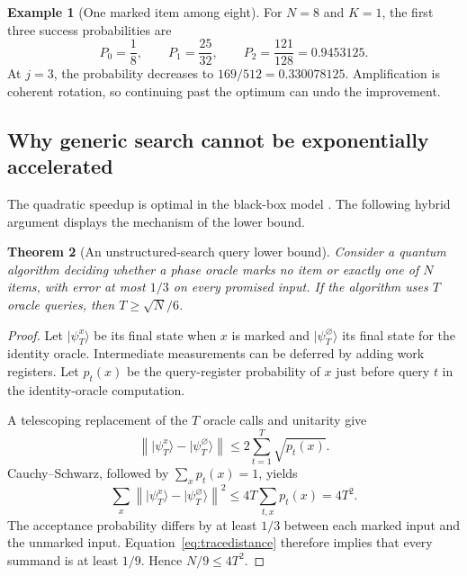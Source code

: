 \documentclass[11pt,a4paper]{article}
\newcommand{\ket}[1]{\lvert #1\rangle}
\newcommand{\norm}[1]{\left\lVert #1\right\rVert}
\newtheorem{theorem}{Theorem}[section]
\theoremstyle{definition}
\newtheorem{example}[theorem]{Example}
\theoremstyle{remark}
\numberwithin{equation}{section}
\begin{document}
\begin{example}[One marked item among eight]
For $N=8$ and $K=1$, the first three success probabilities are
\begin{equation}
 P_0=\frac18,\qquad P_1=\frac{25}{32},\qquad
 P_2=\frac{121}{128}=0.9453125.
\end{equation}
At $j=3$, the probability decreases to $169/512=0.330078125$.
Amplification is coherent rotation, so continuing past the optimum can
undo the improvement.
\end{example}

\subsection{Why generic search cannot be exponentially accelerated}
The quadratic speedup is optimal in the black-box model
\citep{grover1996,bennett1997}. The following hybrid argument displays the
mechanism of the lower bound.

\begin{theorem}[An unstructured-search query lower bound]
Consider a quantum algorithm deciding whether a phase oracle marks no
item or exactly one of $N$ items, with error at most $1/3$ on every
promised input. If the algorithm uses $T$ oracle queries, then
$T\geq\sqrt N/6$.
\end{theorem}
\begin{proof}
Let $\ket{\psi_T^x}$ be its final state when $x$ is marked and
$\ket{\psi_T^\varnothing}$ its final state for the identity oracle.
Intermediate measurements can be deferred by adding work registers.
Let $p_t(x)$ be the query-register probability of $x$ just before query $t$
in the identity-oracle computation.

A telescoping replacement of the $T$ oracle calls and unitarity give
\begin{equation}
 \norm{\ket{\psi_T^x}-\ket{\psi_T^\varnothing}}
 \leq 2\sum_{t=1}^T\sqrt{p_t(x)}.
\end{equation}
Cauchy--Schwarz, followed by $\sum_xp_t(x)=1$, yields
\begin{equation}
 \sum_x\norm{\ket{\psi_T^x}-\ket{\psi_T^\varnothing}}^2
 \leq4T\sum_{t,x}p_t(x)=4T^2.
\end{equation}
The acceptance probability differs by at least $1/3$ between each marked
input and the unmarked input. Equation~\eqref{eq:tracedistance} therefore
implies that every summand is at least $1/9$. Hence $N/9\leq4T^2$.
\end{proof}
\end{document}
